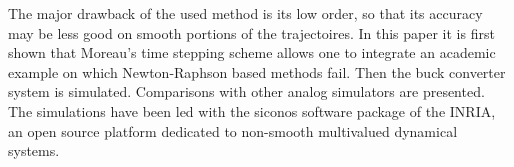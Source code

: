 The major drawback of the used method is its low order, so that its accuracy may be less good on smooth portions of the trajectoires. In this paper it is first shown that Moreau's time stepping scheme allows one to integrate an academic example on which Newton-Raphson based methods fail. Then the buck converter system is simulated. Comparisons with other analog simulators are presented. The simulations have been led with the {\sc siconos} software package of the INRIA, an open source platform dedicated to non-smooth multivalued dynamical systems. 




